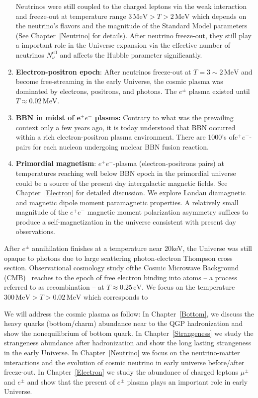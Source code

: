 \begin{enumerate}
Neutrinos were still coupled to the charged leptons via the weak interaction~\cite{Birrell:2012gg,Birrell:2014ona} and freeze-out at temperature range $3\,\mathrm{MeV}>T>2\,\mathrm{MeV}$ which depends on the neutrino's flavors and the magnitude of the Standard Model parameters (See Chapter~\ref{Neutrino} for details). After neutrino freeze-out, they still play a important role in the Universe expansion via the effective number of neutrinos $N_{\nu}^{\mathrm{eff}}$ and affects the Hubble parameter significantly. 
\item \textbf{Electron-positron epoch}: After neutrinos freeze-out at $T=3\sim2\,\mathrm{MeV}$ and become free-streaming in the early Universe, the cosmic plasma was dominated by electrons, positrons, and photons. The $e^\pm$ plasma existed until $T\approx 0.02\,\mathrm{MeV}$. 
\item \textbf{BBN in midst of ${\mathbf e^+e^-}$ plasms:} Contrary to what was the prevailing context only a few years ago, it is today understood that BBN occurred within a rich electron-positron plasma environment. There are 1000's of${  e^+e^-}$-pairs for each nucleon undergoing nuclear BBN fusion reaction.  
\item \textbf{Primordial magnetism}: $e^{+}e^{-}$-plasma (electron-positrons pairs) at temperatures reaching well below BBN epoch in the primordial universe could be a source of the present day intergalactic magnetic fields. See Chapter~\ref{Electron} for detailed discussion. We explore Landau diamagnetic and magnetic dipole moment paramagnetic properties. A relatively small magnitude of the $e^{+}e^{-}$ magnetic moment polarization asymmetry suffices to produce a self-magnetization in the universe consistent with present day observations.
\end{enumerate}

After $e^\pm$ annihilation finishes at a temperature near 20keV, the Universe was still opaque to photons due to large scattering photon-electron Thompson cross section. Observational cosmology study ofthe Cosmic Microwave Background (CMB)~\cite{Planck:2018vyg} reaches to the epoch of free electron binding into atoms -- a process referred to as recombination -- at $T\approx 0.25\,\mathrm{eV}$. We focus on the temperature $300\,\mathrm{MeV}>T>0.02\,\mathrm{MeV}$ which corresponds to 

 We will address the cosmic plasma as follow: In Chapter~\ref{Bottom}, we discuss the heavy quarks (bottom/charm) abundance near to the QGP hadronization and show the nonequilibrium of bottom quark. In Chapter~\ref{Strangeness} we study the strangeness abundance after hadronization and show the long lasting strangeness in the early Universe. In Chapter~\ref{Neutrino} we focus on the neutrino-matter interactions and the evolution of cosmic neutrino in early universe before/after freeze-out. In Chapter~\ref{Electron} we study the abundance of charged leptons $\mu^\pm$ and $e^\pm$ and show that the present of $e^\pm$ plasma plays an important role in early Universe.

